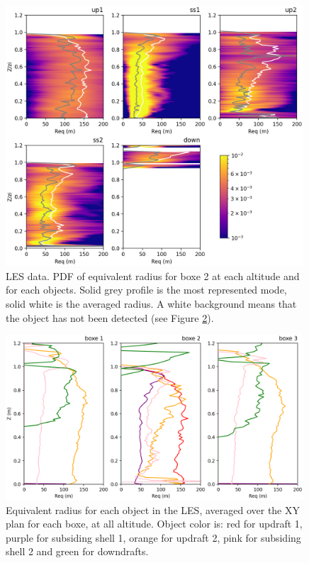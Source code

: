 \documentclass[draft]{agujournal2019} %
\begin{document}
                \begin{figure}[h!]
    				\centering
    				\includegraphics[width=0.99\textwidth]{PDF_Requivalent_boxe2.png}
    				\caption{LES data. PDF of equivalent radius for boxe 2 at each altitude and for each objects. Solid grey profile is the most represented mode, solid white is the averaged radius. A white background means that the object has not been detected (see Figure \ref{mean_req}).}
    				\label{PDF_Requivalent_boxe2}
			    \end{figure} 

                \begin{figure}[h!]
    				\centering
    				\includegraphics[width=0.99\textwidth]{Requivalent_avg_atZ_allobjects_allLESboxes.png}
    				\caption{Equivalent radius for each object in the LES, averaged over the XY plan for each boxe, at all altitude. Object color is: red for updraft 1, purple for subsiding shell 1, orange for updraft 2, pink for subsiding shell 2 and green for downdrafts.}
    				\label{mean_req}
			    \end{figure} 
            
\end{document}
